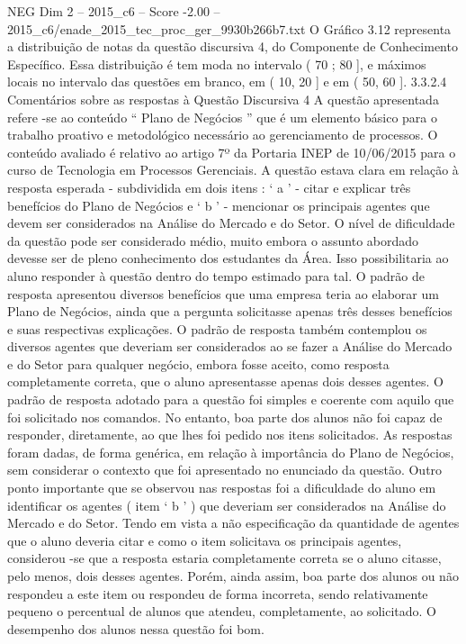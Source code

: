 \begin{textsample}{NEG Dim 2 – 2015\_c6 – Score -2.00 – 2015\_c6/enade\_2015\_tec\_proc\_ger\_9930b266b7.txt}
O Gráfico 3.12 representa a distribuição de notas da questão discursiva 4, do Componente de Conhecimento Específico.
Essa distribuição é tem moda no intervalo ( 70 ; 80 ], e máximos locais no intervalo das questões em branco, em ( 10, 20 ] e em ( 50, 60 ]. 3.3.2.4 Comentários sobre as respostas à Questão Discursiva 4 A questão apresentada refere -se ao conteúdo “ Plano de Negócios ” que é um elemento básico para o trabalho proativo e metodológico necessário ao gerenciamento de processos.
O conteúdo avaliado é relativo ao artigo 7º da Portaria INEP de 10/06/2015 para o curso de Tecnologia em Processos Gerenciais.
A questão estava clara em relação à resposta esperada - subdividida em dois itens : ‘ a ’ - citar e explicar três benefícios do Plano de Negócios e ‘ b ’ - mencionar os principais agentes que devem ser considerados na Análise do Mercado e do Setor.
O nível de dificuldade da questão pode ser considerado médio, muito embora o assunto abordado devesse ser de pleno conhecimento dos estudantes da Área.
Isso possibilitaria ao aluno responder à questão dentro do tempo estimado para tal.
O padrão de resposta apresentou diversos benefícios que uma empresa teria ao elaborar um Plano de Negócios, ainda que a pergunta solicitasse apenas três desses benefícios e suas respectivas explicações.
O padrão de resposta também contemplou os diversos agentes que deveriam ser considerados ao se fazer a Análise do Mercado e do Setor para qualquer negócio, embora fosse aceito, como resposta completamente correta, que o aluno apresentasse apenas dois desses agentes.
O padrão de resposta adotado para a questão foi simples e coerente com aquilo que foi solicitado nos comandos.
No entanto, boa parte dos alunos não foi capaz de responder, diretamente, ao que lhes foi pedido nos itens solicitados.
As respostas foram dadas, de forma genérica, em relação à importância do Plano de Negócios, sem considerar o contexto que foi apresentado no enunciado da questão.
Outro ponto importante que se observou nas respostas foi a dificuldade do aluno em identificar os agentes ( item ‘ b ’ ) que deveriam ser considerados na Análise do Mercado e do Setor.
Tendo em vista a não especificação da quantidade de agentes que o aluno deveria citar e como o item solicitava os principais agentes, considerou -se que a resposta estaria completamente correta se o aluno citasse, pelo menos, dois desses agentes.
Porém, ainda assim, boa parte dos alunos ou não respondeu a este item ou respondeu de forma incorreta, sendo relativamente pequeno o percentual de alunos que atendeu, completamente, ao solicitado.
O desempenho dos alunos nessa questão foi bom.

\end{textsample}
